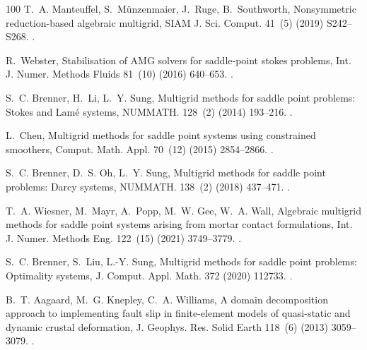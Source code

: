 \documentclass[3p,times]{elsarticle}
\theoremstyle{plain}
\begin{document}
\begin{thebibliography}{100}
T.~A. Manteuffel, S.~M\"{u}nzenmaier, J.~Ruge, B.~Southworth, {Nonsymmetric
  reduction-based algebraic multigrid}, SIAM J. Sci. Comput. 41~(5) (2019)
  S242--S268.
\newblock \href {https://doi.org/10.1137/18M1193761}
  {}.

R.~Webster, {Stabilisation of AMG solvers for saddle-point stokes problems},
  Int. J. Numer. Methods Fluids 81~(10) (2016) 640--653.
\newblock \href {https://doi.org/10.1002/fld.4199}
  {}.

S.~C. Brenner, H.~Li, L.~Y. Sung, {Multigrid methods for saddle point problems:
  Stokes and Lam{\'e} systems}, NUMMATH. 128~(2) (2014) 193--216.
\newblock \href {https://doi.org/10.1007/s00211-014-0607-3}
  {}.

L.~Chen, {Multigrid methods for saddle point systems using constrained
  smoothers}, Comput. Math. Appl. 70~(12) (2015) 2854--2866.
\newblock \href {https://doi.org/10.1016/j.camwa.2015.09.020}
  {}.

S.~C. Brenner, D.~S. Oh, L.~Y. Sung, {Multigrid methods for saddle point
  problems: Darcy systems}, NUMMATH. 138~(2) (2018) 437--471.
\newblock \href {https://doi.org/10.1007/s00211-017-0911-9}
  {}.

T.~A. Wiesner, M.~Mayr, A.~Popp, M.~W. Gee, W.~A. Wall, {Algebraic multigrid
  methods for saddle point systems arising from mortar contact formulations},
  Int. J. Numer. Methods Eng. 122~(15) (2021) 3749--3779.
\newblock \href {https://doi.org/10.1002/nme.6680}
  {}.

S.~C. Brenner, S.~Liu, L.-Y. Sung, {Multigrid methods for saddle point
  problems: Optimality systems}, J. Comput. Appl. Math. 372 (2020) 112733.
\newblock \href {https://doi.org/10.1016/j.cam.2020.112733}
  {}.

B.~T. Aagaard, M.~G. Knepley, C.~A. Williams, {A domain decomposition approach
  to implementing fault slip in finite-element models of quasi-static and
  dynamic crustal deformation}, J. Geophys. Res. Solid Earth 118~(6) (2013)
  3059--3079.
\newblock \href {https://doi.org/10.1002/jgrb.50217}
  {}.


\end{thebibliography}
\end{document}
